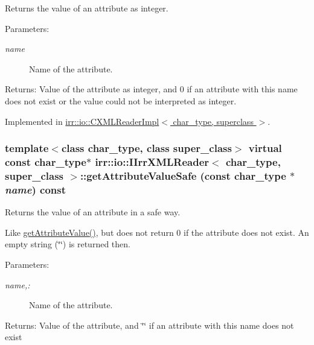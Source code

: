 Returns the value of an attribute as integer. 

\begin{Desc}
\item[Parameters:]
\begin{description}
\item[{\em name}]Name of the attribute. \end{description}
\end{Desc}
\begin{Desc}
\item[Returns:]Value of the attribute as integer, and 0 if an attribute with this name does not exist or the value could not be interpreted as integer. \end{Desc}


Implemented in \hyperlink{classirr_1_1io_1_1_c_x_m_l_reader_impl_5d532267e6e4ac8fcb402671842c32c9}{irr::io::CXMLReaderImpl$<$ char\_\-type, superclass $>$}.\hypertarget{classirr_1_1io_1_1_i_irr_x_m_l_reader_7674852b2e24b2710b90aab10ef1fc22}{
\subsubsection[{getAttributeValueSafe}]{\setlength{\rightskip}{0pt plus 5cm}template$<$class char\_\-type, class super\_\-class$>$ virtual const char\_\-type$\ast$ {\bf irr::io::IIrrXMLReader}$<$ char\_\-type, super\_\-class $>$::getAttributeValueSafe (const char\_\-type $\ast$ {\em name}) const}}
\label{classirr_1_1io_1_1_i_irr_x_m_l_reader_7674852b2e24b2710b90aab10ef1fc22}


Returns the value of an attribute in a safe way. 

Like \hyperlink{classirr_1_1io_1_1_i_irr_x_m_l_reader_41bd71a1b9d4a80cd1d0257dedb35325}{getAttributeValue()}, but does not return 0 if the attribute does not exist. An empty string (\char`\"{}\char`\"{}) is returned then. \begin{Desc}
\item[Parameters:]
\begin{description}
\item[{\em name,:}]Name of the attribute. \end{description}
\end{Desc}
\begin{Desc}
\item[Returns:]Value of the attribute, and \char`\"{}\char`\"{} if an attribute with this name does not exist \end{Desc}


